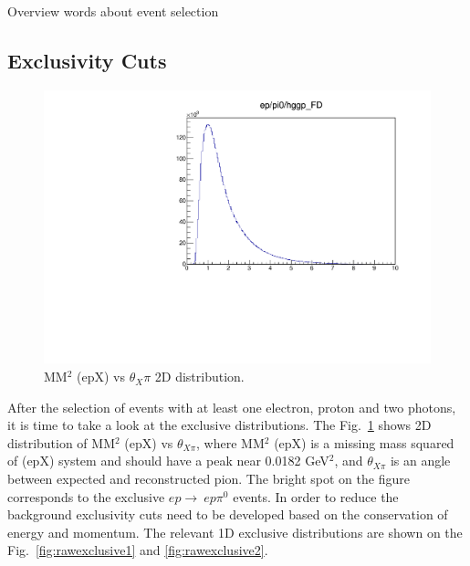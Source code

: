 Overview words about event selection

\subsection{Exclusivity Cuts}\label{sec:eventselection}

    \begin{figure}
    	\vspace*{-0.3cm}
    	\includegraphics[page=10,width=0.97\linewidth]{Chapters/Ch4-BaseAnalysis/1_Event_Selection_Cuts/figures/eppi0.exclusive.pdf}
    	\caption{MM$^2$ (epX) vs $\theta_X\pi$ 2D distribution.}
    	\label{fig:MM2vsThetaXPi}
    \end{figure}
    After the selection of events with at least one electron, proton and two photons, it is time to take a look at the exclusive distributions.
    The Fig.~\ref{fig:MM2vsThetaXPi} shows 2D distribution of MM$^2$ (epX) vs $\theta_{X\pi}$, where MM$^2$ (epX) is a missing mass squared of (epX) system and should have a peak near 0.0182 GeV$^2$, and $\theta_{X\pi}$ is an angle between expected and reconstructed pion.
    The bright spot on the figure corresponds to the exclusive $ep\rightarrow~ep\pi^0$ events.
    In order to reduce the background exclusivity cuts  need to be developed based on the conservation of energy and momentum.
    The relevant 1D exclusive distributions are shown on the Fig.~\ref{fig:rawexclusive1} and \ref{fig:rawexclusive2}.
    
